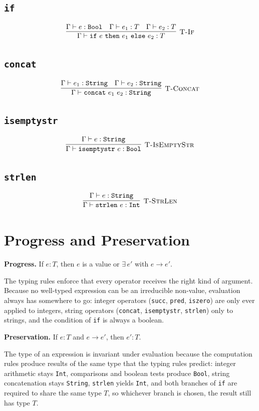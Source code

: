 \documentclass[11pt]{article}
\newcommand{\typeof}[2]{#1 : #2}
\newcommand{\step}[2]{#1 \to #2}
\begin{document}
\subsection*{\texttt{if}}

\[
\infer[\textsc{T-If}]
  {\Gamma \vdash \texttt{if}\ e\ \texttt{then}\ e_1\ \texttt{else}\ e_2 : T}
  {\Gamma \vdash e : \texttt{Bool}
   & \Gamma \vdash e_1 : T
   & \Gamma \vdash e_2 : T}
\]

\subsection*{\texttt{concat}}

\[
\infer[\textsc{T-Concat}]
  {\Gamma \vdash \texttt{concat}\ e_1\ e_2 : \texttt{String}}
  {\Gamma \vdash e_1 : \texttt{String}
   & \Gamma \vdash e_2 : \texttt{String}}
\]

\subsection*{\texttt{isemptystr}}

\[
\infer[\textsc{T-IsEmptyStr}]
  {\Gamma \vdash \texttt{isemptystr}\ e : \texttt{Bool}}
  {\Gamma \vdash e : \texttt{String}}
\]

\subsection*{\texttt{strlen}}

\[
\infer[\textsc{T-StrLen}]
  {\Gamma \vdash \texttt{strlen}\ e : \texttt{Int}}
  {\Gamma \vdash e : \texttt{String}}
\]

\section*{Progress and Preservation}

\textbf{Progress.}
If $\typeof{e}{T}$, then $e$ is a value or $\exists\, e'$ with $\step{e}{e'}$.

The typing rules enforce that every operator receives the right kind of argument.
Because no well-typed expression can be an irreducible non-value, evaluation always has somewhere to go:
integer operators (\texttt{succ}, \texttt{pred}, \texttt{iszero}) are only ever applied to integers,
string operators (\texttt{concat}, \texttt{isemptystr}, \texttt{strlen}) only to strings,
and the condition of \texttt{if} is always a boolean.

\medskip
\textbf{Preservation.}
If $\typeof{e}{T}$ and $\step{e}{e'}$, then $\typeof{e'}{T}$.

The type of an expression is invariant under evaluation because the computation rules produce
results of the same type that the typing rules predict:
integer arithmetic stays \texttt{Int}, comparisons and boolean tests produce \texttt{Bool},
string concatenation stays \texttt{String}, \texttt{strlen} yields \texttt{Int},
and both branches of \texttt{if} are required to share the same type $T$,
so whichever branch is chosen, the result still has type $T$.
\end{document}
